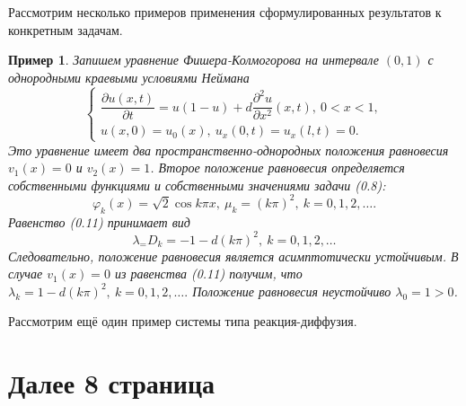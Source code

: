 \documentclass[9pt, a4paper]{extarticle}
\newtheorem{sample}{Пример}
\numberwithin{equation}{section}
\numberwithin{lemma}{section}
\numberwithin{definition}{section}
\numberwithin{notabene}{section}
\numberwithin{corollary}{section}
\begin{document}
	Рассмотрим несколько примеров применения сформулированных результатов к конкретным задачам.
	\begin{sample}
		Запишем уравнение Фишера-Колмогорова на интервале $(0,1)$ с однородными краевыми условиями Неймана
		\begin{equation*}
			\begin{cases}
				\dfrac{\partial u(x,t)}{\partial t} = u(1-u) + d \dfrac{\partial^2 u}{\partial x^2}(x,t), \ 0 < x < 1,\\
				u(x,0) = u_0(x), \ u_x(0,t) = u_x(l,t) = 0.
			\end{cases}
		\end{equation*}
		Это уравнение имеет два пространственно-однородных положения равновесия $v_1(x) = 0$ и $v_2(x) = 1$. Второе положение равновесия определяется собственными функциями и собственными значениями задачи (0.8):
		\begin{equation*}
			\varphi_k(x) = \sqrt2 \cos{k\pi x}, \ \mu_k = \left(k\pi\right)^2, \ k = 0,1, 2, \dots .
		\end{equation*}
		Равенство (0.11) принимает вид
		\begin{equation*}
			\lambda_ = D_k = -1 -d\left(k\pi\right)^2, \ k =0,1 ,2,\dots
		\end{equation*}
		Следовательно, положение равновесия является асимптотически устойчивым. \newline
		В случае $v_1(x) = 0$ из равенства (0.11) получим, что  $\lambda_k = 1 - d\left(k\pi\right)^2, \ k = 0,1,2,\dots.$\newline
		Положение равновесия неустойчиво $\lambda_0  = 1 > 0$.
	\end{sample}
	
	Рассмотрим ещё один пример системы типа реакция-диффузия. 
	\section*{Далее 8 страница}
\end{document}
